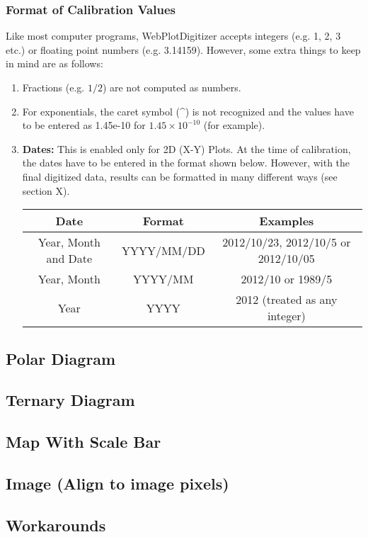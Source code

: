 \documentclass[letterpaper, 10pt]{article}
\begin{document}
\subsubsection{Format of Calibration Values}
Like most computer programs, WebPlotDigitizer accepts integers (e.g. 1, 2, 3 etc.) or floating point numbers (e.g. 3.14159). However, some extra things to keep in mind are as follows:
\begin{enumerate}
\item{Fractions (e.g. $1/2$) are not computed as numbers.}
\item{For exponentials, the caret symbol (\^{}) is not recognized and the values have to be entered as 1.45e-10 for $1.45 \times 10^{-10}$ (for example).}
\item{{\bf Dates:} This is enabled only for 2D (X-Y) Plots. At the time of calibration, the dates have to be entered in the format shown below. However, with the final digitized data, results can be formatted in many different ways (see section X).
\begin{center}
\begin{tabular}{|c|c|c|}
\hline
Date & Format & Examples\\
\hline
Year, Month and Date & YYYY/MM/DD & 2012/10/23, 2012/10/5 or 2012/10/05\\
Year, Month & YYYY/MM & 2012/10 or 1989/5\\
Year & YYYY & 2012 (treated as any integer)\\
\hline
\end{tabular}
\end{center}
}
\end{enumerate}





\subsection{Polar Diagram}
\subsection{Ternary Diagram}
\subsection{Map With Scale Bar}
\subsection{Image (Align to image pixels)}
\subsection{Workarounds}
\end{document}
